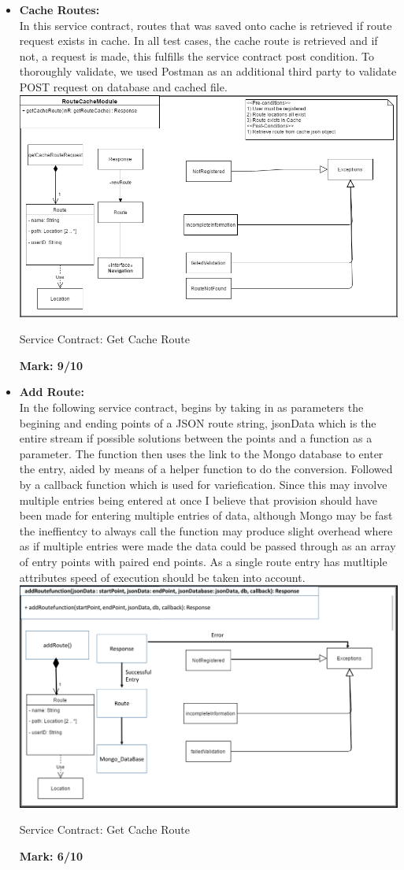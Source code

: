 \begin{itemize}
\item \textbf{Cache Routes:}\\In this service contract, routes that was saved onto cache is retrieved if route request exists in cache. In all test cases, the cache route is retrieved and if not, a request is made, this fulfills the service contract post condition. To thoroughly validate, we used Postman as an additional third party to validate POST request on database and cached file.\\
\includegraphics[scale=0.5]{CacheRoute.png}
\caption{Service Contract: Get Cache Route}
	\textbf{Mark: 9/10}
	
\item \textbf{Add Route:}\\In the following service contract, begins by taking in as parameters the begining and ending points of a JSON route string, jsonData which is the entire stream if possible solutions between the points and a function as a parameter. The function then uses the link to the Mongo database to enter the entry, aided by means of a helper function to do the conversion. Followed by a callback function which is used for variefication.
Since this may involve multiple entries being entered at once I believe that provision should have been made for entering multiple entries of data, although Mongo may be fast the ineffientcy to always call the function may produce slight overhead where as if multiple entries were made the data could be passed through as an array of entry points with paired end points. As a single route entry has mutltiple attributes speed of execution should be taken into account.\\
\includegraphics[scale=0.5]{AddRoute.png}
\caption{Service Contract: Get Cache Route}
	\textbf{Mark: 6/10}
	
\end{itemize}
